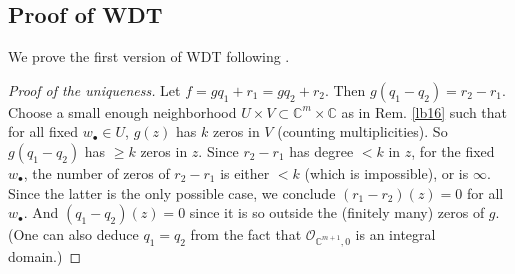 \documentclass[12pt,b5paper,notitlepage]{report}
\theoremstyle{definition}
\newtheorem{rem}[df]{Remark}
\theoremstyle{plain}
\newcommand{\mc}{\mathcal}
\newcommand{\scr}{\mathscr}
\newcommand{\blt}{\bullet}
\newcommand{\Cbb}{\mathbb C}
\numberwithin{equation}{section}
\begin{document}
\begin{comment}
\begin{rem}
One may compare the above proof with the proof of \textbf{Hilbert basis theorem}: if $\mc A$ is a Noetherian ring, then $\mc R=\mc A[z]$ is Noetherian.

It is not hard to see that in order to prove this theorem, it suffices to prove:
\begin{itemize}
\item Claim: If $I$ is an ideal of $\mc R$, then there exist $g_1,\dots,g_N\in I$ such that $I/\sum_{i=1}^N g_i\mc R$ is $\mc R$-finitely generated.
\end{itemize}
To prove the claim, we let $J$ be the set of leading coefficients of $\mc A$-polynomials in $\mc R$, which is clearly an ideal of $\mc A$. Since $\mc A$ is Noetherian, $J$ is finitely generated. So we can find $p_1,\dots,p_n\in I$ whose leading coefficients generate $J$. Let $r$ be the largest degree of $g_1,\dots,g_n$. Since $\mc M=\bigoplus_{j=0}^{r-1}\mc Az^j$ is a finitely-generated $\mc A$-module and hence Noetherian, $I\cap \mc M$ is $\mc A$-generated by some $g_{n+1},\dots,g_N$. Such $\{g_1,\dots,g_N\}$ makes the claim true.
\end{rem}
\end{comment}





\subsection{Proof of WDT}

We prove the first version of WDT following \cite{GR-b}.
\begin{proof}[Proof of the uniqueness]
Let $f=gq_1+r_1=gq_2+r_2$. Then $g(q_1-q_2)=r_2-r_1$. Choose a small enough neighborhood $U\times V\subset\Cbb^m\times\Cbb$ as in Rem. \ref{lb16} such that for all fixed $w_\blt\in U$, $g(z)$ has $k$ zeros in $V$ (counting multiplicities). So $g(q_1-q_2)$ has $\geq k$ zeros in $z$. Since $r_2-r_1$ has degree $<k$ in $z$, for the fixed $w_\blt$, the number of zeros of $r_2-r_1$ is either $<k$ (which is impossible), or is $\infty$. Since the latter is the only possible case, we conclude $(r_1-r_2)(z)=0$ for all $w_\blt$. And $(q_1-q_2)(z)=0$  since it is so outside the (finitely many) zeros of $g$. (One can also deduce $q_1=q_2$ from the fact that $\scr O_{\Cbb^{m+1},0}$ is an integral domain.)
\end{proof}
\end{document}
